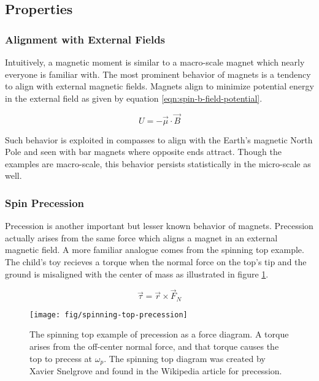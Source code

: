 \subsection{Properties}

\subsubsection{Alignment with External Fields}
Intuitively, a magnetic moment is similar to a macro-scale magnet which nearly everyone is familiar with.  The most prominent behavior of magnets is a tendency to align with external magnetic fields.  Magnets align to minimize potential energy in the external field as given by equation \ref{eqn:spin-b-field-potential}. 

\begin{equation}
\label{eqn:spin-b-field-potential}
U = -\vec{\mu} \cdot \vec{B}
\end{equation}

\noindent 
Such behavior is exploited in compasses to align with the Earth's magnetic North Pole and seen with bar magnets where opposite ends attract.  Though the examples are macro-scale, this behavior persists statistically in the micro-scale as well.

\subsubsection{Spin Precession}
Precession is another important but lesser known behavior of magnets.  Precession actually arises from the same force which aligns a magnet in an external magnetic field.  A more familiar analogue comes from the spinning top example.  The child's toy recieves a torque when the normal force on the top's tip and the ground is misaligned with the center of mass as illustrated in figure \ref{fig:spinning-top-precession}.

\begin{equation}
\label{eqn:top-torque-equation}
\vec{\tau} = \vec{r} \times \vec{F}_{N}
\end{equation}

\begin{figure}
\centering
\texttt{[image: fig/spinning-top-precession]}
\caption{
    The spinning top example of precession as a force diagram.  A torque arises from the off-center normal force, and that torque causes the top to precess at $\omega_p$.  The spinning top diagram was created by Xavier Snelgrove and found in the Wikipedia article for precession. 
    \label{fig:spinning-top-precession}
}
\end{figure}

